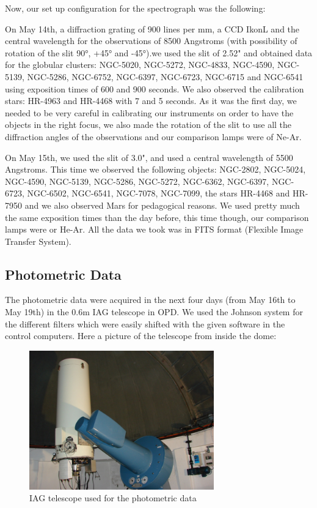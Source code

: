 Now, our set up configuration for the spectrograph was the following:

On May 14th, a diffraction grating of 900 lines per mm, a CCD IkonL and the central wavelength for the observations of 8500 Angstroms (with possibility of rotation of the slit 90°, +45° and -45°).we used the slit of 2.52" and obtained data for the globular clusters: NGC-5020, NGC-5272, NGC-4833, NGC-4590, NGC-5139, NGC-5286, NGC-6752, NGC-6397, NGC-6723, NGC-6715 and NGC-6541 using exposition times of 600 and 900 seconds. We also observed the calibration stars: HR-4963 and HR-4468 with 7 and 5 seconds. As it was the first day, we needed to be very careful in calibrating our instruments on order to have the objects in the right focus, we also made the rotation of the slit to use all the diffraction angles of the observations and our comparison lamps were of Ne-Ar.

On May 15th, we used the slit of 3.0", and used a central wavelength of 5500 Angstroms. This time we observed the following objects: NGC-2802, NGC-5024, NGC-4590, NGC-5139, NGC-5286, NGC-5272, NGC-6362, NGC-6397, NGC-6723, NGC-6502, NGC-6541, NGC-7078, NGC-7099, the stars HR-4468 and HR-7950 and we also observed Mars for pedagogical reasons. We used pretty much the same exposition times than the day before, this time though, our comparison lamps were or He-Ar. All the data we took was in FITS format (Flexible Image Transfer System).

\subsection{Photometric Data}

The photometric data were acquired in the next four days (from May 16th to May 19th) in the 0.6m IAG telescope in OPD. We used the Johnson system for the different filters which were easily shifted with the given software in the control computers. Here a picture of the telescope from inside the dome:

\begin{figure}[H]
\centering
\includegraphics[width=8cm]{images/opd-photometry.jpg}
\caption{IAG telescope used for the photometric data}
\end{figure}

